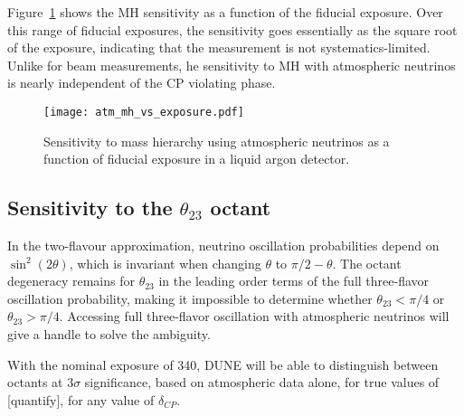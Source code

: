 
Figure~\ref{fig:atm_mh} shows the MH sensitivity as a function of the fiducial exposure. 
Over this range of fiducial exposures, the sensitivity goes essentially as the square 
root of the exposure, indicating that the measurement is not systematics-limited. 
Unlike for beam measurements, he sensitivity to MH with atmospheric neutrinos is 
nearly independent of the CP violating phase.

\begin{figure}[!htb]
\centering
\texttt{[image: atm\_mh\_vs\_exposure.pdf]}
\caption[MH Sensitivity vs. Exposure for Atmospheric Neutrinos]
{Sensitivity to mass hierarchy using atmospheric neutrinos as a function of fiducial 
exposure in a liquid argon detector.}
\label{fig:atm_mh}
\end{figure}

\subsection{Sensitivity to the $\theta_{23}$ octant}

In the two-flavour approximation, neutrino oscillation probabilities depend on 
$\sin^2(2θ)$, which is invariant when changing $\theta$ to $\pi/2-\theta$. The octant 
degeneracy remains for $\theta_{23}$ in the leading order terms of the full 
three-flavor oscillation probability, making it impossible to determine whether $\theta_{23}< \pi/4$ or 
$\theta_{23}> \pi/4$. Accessing full three-flavor oscillation with atmospheric neutrinos 
will give a handle to solve the ambiguity.

With the nominal exposure of \SI{340}{\ktyr}, DUNE will be able to distinguish between 
octants at 3$\sigma$ significance, based on atmospheric data alone, for true values of [quantify], 
for any value of $\delta_{CP}$.

